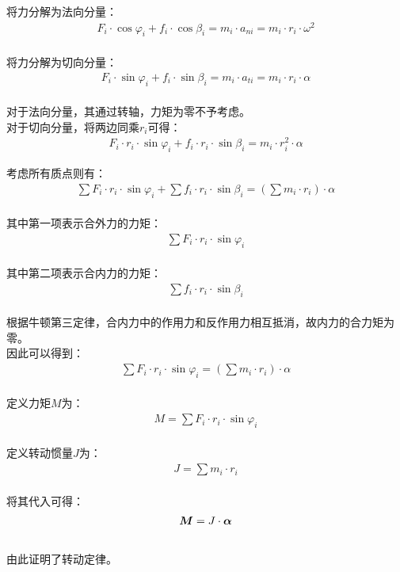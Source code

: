 \documentclass[UTF8]{ctexart}
\newcommand*{\veb}[1]{\vb*{#1}}
\begin{document}
    将力分解为法向分量：
    \begin{align}
        F_i\cdot\cos\varphi_i+f_i\cdot\cos\beta_i=m_i\cdot a_{ni}=m_i\cdot r_i\cdot\omega^2
    \end{align}\\
    将力分解为切向分量：
    \begin{align}
        F_i\cdot\sin\varphi_i+f_i\cdot\sin\beta_i=m_i\cdot a_{ti}=m_i\cdot r_i\cdot\alpha
    \end{align}\\
    对于法向分量，其通过转轴，力矩为零不予考虑。\\[3mm]
    对于切向分量，将两边同乘$r_i$可得：
    \begin{align}
        F_i\cdot r_i\cdot\sin\varphi_i+f_i\cdot r_i\cdot\sin\beta_i=m_i\cdot r_i^2\cdot\alpha
    \end{align}

\newpage

    考虑所有质点则有：
    \begin{align}
        \sum F_i\cdot r_i\cdot\sin\varphi_i+\sum f_i\cdot r_i\cdot\sin\beta_i=\left(\sum m_i\cdot r_i\right)\cdot\alpha
    \end{align}\\
    其中第一项表示合外力的力矩：
    \begin{align}
        \sum F_i\cdot r_i\cdot\sin\varphi_i
    \end{align}\\
    其中第二项表示合内力的力矩：
    \begin{align}
        \sum f_i\cdot r_i\cdot\sin\beta_i
    \end{align}\\
    根据牛顿第三定律，合内力中的作用力和反作用力相互抵消，故内力的合力矩为零。\\[16mm]
    因此可以得到：
    \begin{align}
        \sum F_i\cdot r_i\cdot\sin\varphi_i=\left(\sum m_i\cdot r_i\right)\cdot\alpha
    \end{align}\\
    定义力矩$M$为：
    \begin{align}
        M=\sum F_i\cdot r_i\cdot\sin\varphi_i
    \end{align}\\
    定义转动惯量$J$为：
    \begin{align}
        J=\sum m_i\cdot r_i
    \end{align}\\
    将其代入可得：
    \begin{align}
        \veb{M}=J\cdot\veb{\alpha}
    \end{align}\\
    由此证明了转动定律。
\end{document}
